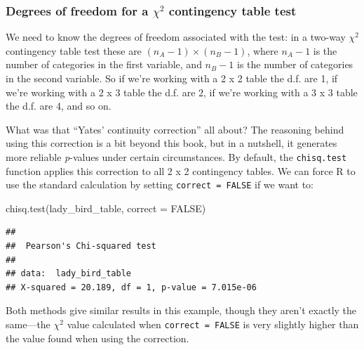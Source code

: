 \documentclass[
]{book}
\newenvironment{Shaded}{\begin{snugshade}}{\end{snugshade}}
\newcommand{\AttributeTok}[1]{\textcolor[rgb]{0.77,0.63,0.00}{#1}}
\newcommand{\ConstantTok}[1]{\textcolor[rgb]{0.00,0.00,0.00}{#1}}
\newcommand{\FunctionTok}[1]{\textcolor[rgb]{0.00,0.00,0.00}{#1}}
\newcommand{\NormalTok}[1]{#1}
\newenvironment{greybox}{
  \definecolor{shadecolor}{rgb}{0.95,0.95,0.95}  %
  \color{black}
  \begin{shaded}}
 {\end{shaded}}
\newenvironment{infobox}[1]
  {
  \begin{itemize}
  \renewcommand{\labelitemi}{
    \raisebox{-.7\height}[0pt][0pt]{
      {\setkeys{Gin}{width=3em,keepaspectratio}
        \texttt{[image: images/\#1]}}
    }
  }
  \setlength{\fboxsep}{1em}
  \begin{greybox}
  \item
  }
  {
  \end{greybox}
  \end{itemize}
  }
\begin{document}
\begin{infobox}{information}

\hypertarget{degrees-of-freedom-for-a-chi2-contingency-table-test}{%
\subsubsection*{\texorpdfstring{Degrees of freedom for a \(\chi^{2}\) contingency table test}{Degrees of freedom for a \textbackslash chi\^{}\{2\} contingency table test}}\label{degrees-of-freedom-for-a-chi2-contingency-table-test}}

We need to know the degrees of freedom associated with the test: in a two-way \(\chi^{2}\) contingency table test these are \((n_A-1) \times (n_B-1)\), where \(n_A-1\) is the number of categories in the first variable, and \(n_B-1\) is the number of categories in the second variable. So if we're working with a 2 x 2 table the d.f. are 1, if we're working with a 2 x 3 table the d.f. are 2, if we're working with a 3 x 3 table the d.f. are 4, and so on.

\end{infobox}

What was that ``Yates' continuity correction'' all about? The reasoning behind using this correction is a bit beyond this book, but in a nutshell, it generates more reliable \emph{p}-values under certain circumstances. By default, the \texttt{chisq.test} function applies this correction to all 2 x 2 contingency tables. We can force R to use the standard calculation by setting \texttt{correct\ =\ FALSE} if we want to:

\begin{Shaded}
\begin{Highlighting}[]
\FunctionTok{chisq.test}\NormalTok{(lady\_bird\_table, }\AttributeTok{correct =} \ConstantTok{FALSE}\NormalTok{)}
\end{Highlighting}
\end{Shaded}

\begin{verbatim}
## 
##  Pearson's Chi-squared test
## 
## data:  lady_bird_table
## X-squared = 20.189, df = 1, p-value = 7.015e-06
\end{verbatim}

Both methods give similar results in this example, though they aren't exactly the same---the \(\chi^{2}\) value calculated when \texttt{correct\ =\ FALSE} is very slightly higher than the value found when using the correction.
\end{document}
